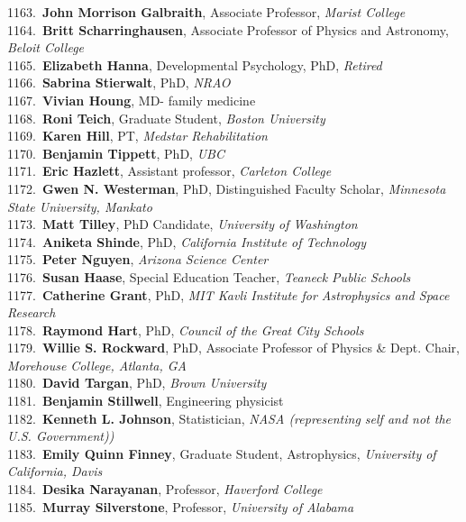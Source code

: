 1163.~{\bf John Morrison Galbraith}, Associate Professor, {\sl Marist College} \\
1164.~{\bf Britt Scharringhausen}, Associate Professor of Physics and Astronomy, {\sl Beloit College} \\
1165.~{\bf Elizabeth Hanna}, Developmental Psychology, PhD, {\sl Retired} \\
1166.~{\bf Sabrina Stierwalt}, PhD, {\sl NRAO} \\
1167.~{\bf Vivian Houng}, MD- family medicine \\
1168.~{\bf Roni Teich}, Graduate Student, {\sl Boston University} \\
1169.~{\bf Karen Hill}, PT, {\sl Medstar Rehabilitation} \\
1170.~{\bf Benjamin Tippett}, PhD, {\sl UBC} \\
1171.~{\bf Eric Hazlett}, Assistant professor, {\sl Carleton College} \\
1172.~{\bf Gwen N. Westerman}, PhD, Distinguished Faculty Scholar, {\sl Minnesota State University, Mankato } \\
1173.~{\bf Matt Tilley}, PhD Candidate, {\sl University of Washington} \\
1174.~{\bf Aniketa Shinde}, PhD, {\sl California Institute of Technology} \\
1175.~{\bf Peter Nguyen}, {\sl Arizona Science Center} \\
1176.~{\bf Susan Haase}, Special Education Teacher, {\sl Teaneck Public Schools} \\
1177.~{\bf Catherine Grant}, PhD, {\sl MIT Kavli Institute for Astrophysics and Space Research} \\
1178.~{\bf Raymond Hart}, PhD, {\sl Council of the Great City Schools} \\
1179.~{\bf Willie S. Rockward}, PhD, Associate Professor of Physics \& Dept. Chair, {\sl Morehouse College, Atlanta, GA} \\
1180.~{\bf David Targan}, PhD, {\sl Brown University} \\
1181.~{\bf Benjamin Stillwell}, Engineering physicist \\
1182.~{\bf Kenneth L. Johnson}, Statistician, {\sl NASA (representing self and not the U.S. Government))} \\
1183.~{\bf Emily Quinn Finney}, Graduate Student, Astrophysics, {\sl University of California, Davis} \\
1184.~{\bf Desika Narayanan}, Professor, {\sl Haverford College} \\
1185.~{\bf Murray Silverstone}, Professor, {\sl University of Alabama} \\
